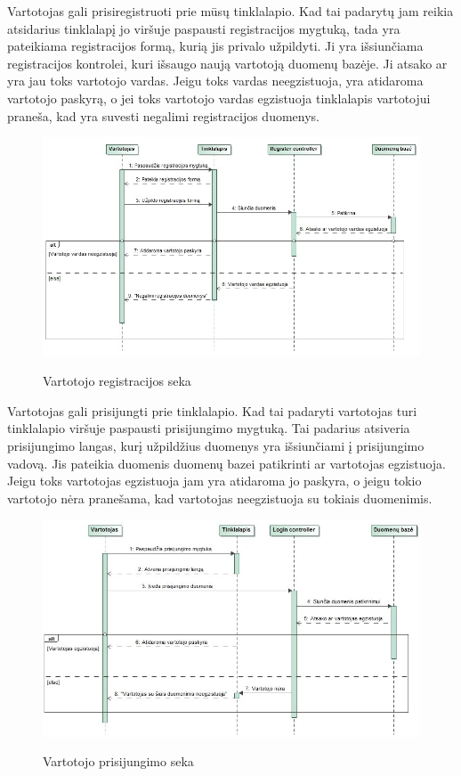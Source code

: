 ﻿\documentclass{VUMIFPSkursinis}
\begin{document}
Vartotojas gali prisiregistruoti prie mūsų tinklalapio. Kad tai padarytų jam reikia atsidarius tinklalapį jo viršuje paspausti registracijos mygtuką, tada yra pateikiama registracijos formą, kurią jis privalo užpildyti. Ji yra išsiunčiama registracijos kontrolei, kuri išsaugo naują vartotoją duomenų bazėje. Ji atsako ar yra jau toks vartotojo vardas.  Jeigu toks vardas neegzistuoja, yra atidaroma vartotojo paskyrą, o jei toks vartotojo vardas egzistuoja tinklalapis vartotojui praneša, kad yra suvesti negalimi registracijos duomenys.

\begin{figure}[H]
    \centering
    \includegraphics[scale=0.5]{img/Pav/VartotojoRegistracija}
    \label{img:uml2}
	\caption{Vartotojo registracijos seka}
\end{figure}

Vartotojas gali prisijungti prie tinklalapio. Kad tai padaryti vartotojas turi tinklalapio viršuje paspausti prisijungimo mygtuką. Tai padarius atsiveria prisijungimo langas, kurį užpildžius duomenys yra išsiunčiami į prisijungimo vadovą. Jis pateikia duomenis duomenų bazei patikrinti ar vartotojas egzistuoja. Jeigu toks vartotojas egzistuoja jam yra atidaroma jo paskyra, o jeigu tokio vartotojo nėra pranešama, kad vartotojas neegzistuoja su tokiais duomenimis.

\begin{figure}[H]
    \centering
    \includegraphics[scale=0.5]{img/Pav/VartotojoPrisijungimas}
    \label{img:uml3}
	\caption{Vartotojo prisijungimo seka}
\end{figure}
\end{document}
